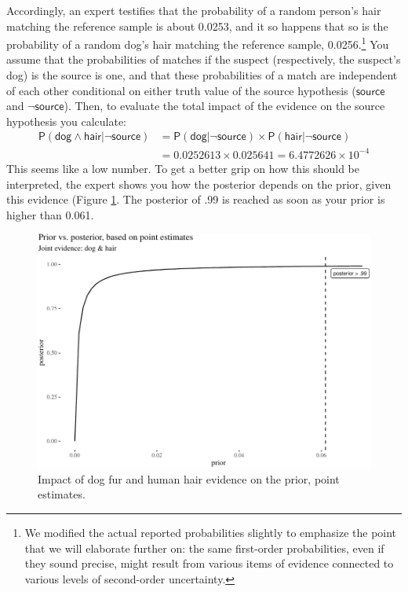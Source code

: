 \documentclass[
  10pt,
  dvipsnames,enabledeprecatedfontcommands]{scrartcl}
\newcommand{\pr}[1]{\mathsf{P}(#1)}
\newcommand{\s}[1]{\mbox{$\mathsf{#1}$}}
\begin{document}
Accordingly, an expert testifies that the probability of a random
person's hair matching the reference sample is about 0.0253, and it so
happens that so is the probability of a random dog's hair matching the
reference sample, 0.0256.\footnote{We modified the actual reported
  probabilities slightly to emphasize the point that we will elaborate
  further on: the same first-order probabilities, even if they sound
  precise, might result from various items of evidence connected to
  various levels of second-order uncertainty.} You assume that the
probabilities of matches if the suspect (respectively, the suspect's
dog) is the source is one, and that these probabilities of a match are
independent of each other conditional on either truth value of the
source hypothesis (\(\mathsf{source}\) and \(\neg \mathsf{source}\)).
Then, to evaluate the total impact of the evidence on the source
hypothesis you calculate: \begin{align*}
\pr{\s{dog}\wedge \s{hair} \vert \neg \s{source}} & = \pr{\s{dog} \vert \neg \s{source}} \times \pr{\s{hair} \vert \neg \s{source}} \\
& =  0.0252613 \times  0.025641 = \ensuremath{6.4772626\times 10^{-4}}
\end{align*} This seems like a low number. To get a better grip on how
this should be interpreted, the expert shows you how the posterior
depends on the prior, given this evidence (Figure
\ref{fig:impactOfPoint}. The posterior of .99 is reached as soon as your
prior is higher than 0.061.

\begin{figure}[H]

\begin{center}\includegraphics[width=0.8\linewidth]{chapter-outline_files/figure-latex/impactOfPoint4-1} \end{center}
\caption{Impact of dog fur and human hair evidence on the prior, point estimates.}
\label{fig:impactOfPoint}
\end{figure}
\end{document}
